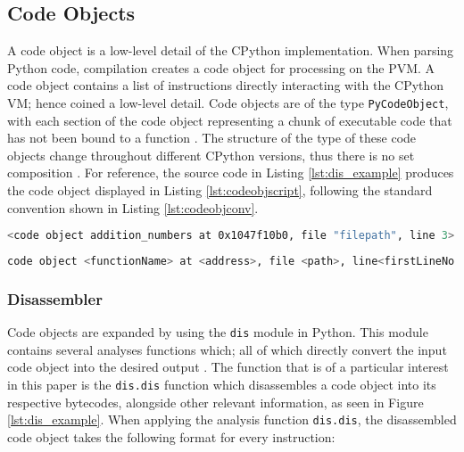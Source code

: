 {\begin{figure}[H]
			\end{figure}

		\subsection{Code Objects}
		\label{subsec:code_obj}
		
		\par A code object is a low-level detail of the CPython implementation. When parsing Python code, compilation creates a code object for processing on the \acs{PVM}. A code object contains a list of instructions directly interacting with the CPython \acs{VM}; hence coined a low-level detail. Code objects are of the type \lstinline|PyCodeObject|, with each section of the code object representing 
		a chunk of executable code that has not been bound to a function \cite[]{pythonofficial2022docspycode}. The structure of the type of these code 
		objects change throughout different CPython versions, thus there is no set composition \cite[]{pythonofficial2022docspycode}. For reference, the source code in Listing \ref{lst:dis_example} produces
		the code object displayed in Listing \ref{lst:codeobjscript}, following the standard convention shown in Listing \ref{lst:codeobjconv}.
		
		\begin{lstlisting}[float=h,language=bash, caption= Code object of Listing \ref{lst:dis_example},numbers=none]
			<code object addition_numbers at 0x1047f10b0, file "filepath", line 3>
		\end{lstlisting}\label{lst:codeobjscript}
		
		\small
		\begin{lstlisting}[float=h,language=bash, caption= Code object standard convention,numbers=none]
			code object <functionName> at <address>, file <path>, line<firstLineNo.>
		\end{lstlisting}\label{lst:codeobjconv}
		
		\normalsize

			\subsubsection*{Disassembler}
			\par Code objects are expanded by using the \lstinline|dis| module in Python. This module contains several analyses functions which; all of which directly convert the input code object into the desired output \cite[]{pythonofficial2022docsdismodule}.
			The function that is of a particular interest in this paper is the \lstinline|dis.dis| function which disassembles a code object into its respective bytecodes, alongside other relevant information, as seen in Figure \ref*{lst:dis_example}.
			When applying the analysis function \lstinline|dis.dis|, the disassembled code object takes the following format for every instruction:
			
}
